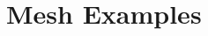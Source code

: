 \documentclass{article}
\begin{document}
\section{Mesh Examples}
\label{sec:MeshExamples}
\end{document}
